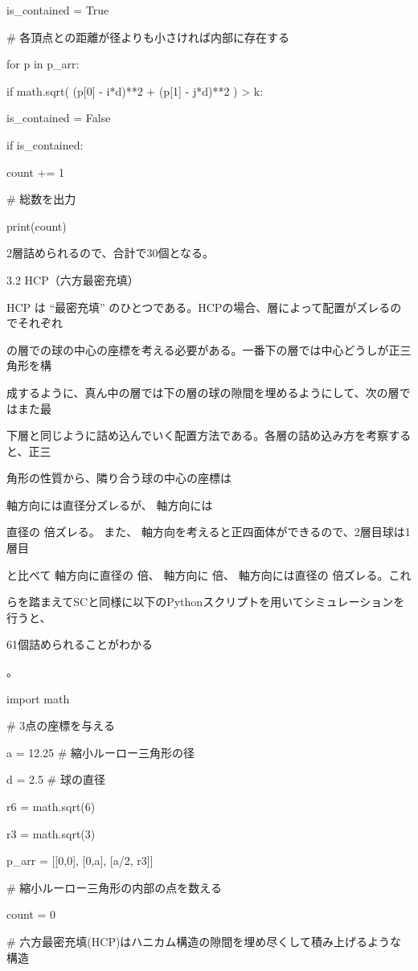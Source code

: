 is\_contained = True\par
\# 各頂点との距離が径よりも小さければ内部に存在する\par
for p in p\_arr:\par
if math.sqrt( (p[0] - i*d)**2 + (p[1] - j*d)**2 ) > k:\par
is\_contained = False\par
if is\_contained:\par
count += 1\par
\# 総数を出力\par
print(count)\par
2層詰められるので、合計で30個となる。\par
3.2 HCP（六⽅最密充填）\par
HCP は “最密充填” のひとつである。HCPの場合、層によって配置がズレるのでそれぞれ\par
の層での球の中⼼の座標を考える必要がある。⼀番下の層では中⼼どうしが正三⾓形を構\par
成するように、真ん中の層では下の層の球の隙間を埋めるようにして、次の層ではまた最\par
下層と同じように詰め込んでいく配置⽅法である。各層の詰め込み⽅を考察すると、正三\par
⾓形の性質から、隣り合う球の中⼼の座標は\par
軸⽅向には直径分ズレるが、 軸⽅向には\par
直径の 倍ズレる。 また、 軸⽅向を考えると正四⾯体ができるので、2層⽬球は1層⽬\par
と⽐べて 軸⽅向に直径の 倍、 軸⽅向に 倍、 軸⽅向には直径の 倍ズレる。これ\par
らを踏まえてSCと同様に以下のPythonスクリプトを⽤いてシミュレーションを⾏うと、\par
61個詰められることがわかる\par
。\par
import math\par
\# 3点の座標を与える\par
a = 12.25 \# 縮小ルーロー三角形の径\par
d = 2.5   \# 球の直径\par
r6 = math.sqrt(6)\par
r3 = math.sqrt(3)\par
p\_arr = [[0,0], [0,a], [a/2, r3]]\par
\# 縮小ルーロー三角形の内部の点を数える\par
count = 0\par
\# 六方最密充填(HCP)はハニカム構造の隙間を埋め尽くして積み上げるような構造\par
